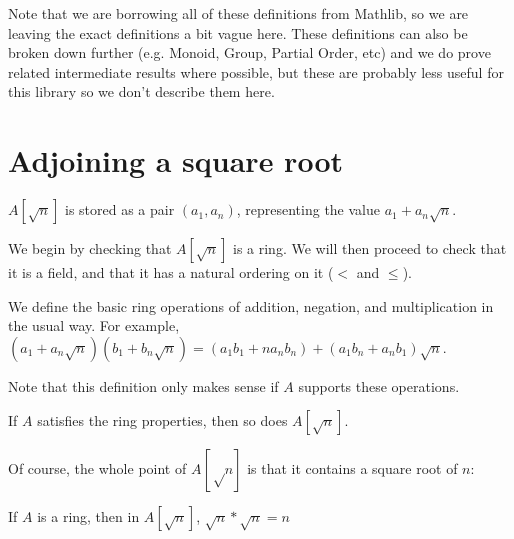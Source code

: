 Note that we are borrowing all of these definitions from Mathlib, so we are
leaving the exact definitions a bit vague here.  These definitions can also be
broken down further (e.g. Monoid, Group, Partial Order, etc) and we do prove
related intermediate results where possible, but these are probably less useful
for this library so we don't describe them here.

\section{Adjoining a square root}


\begin{definition}
  \label{def:adjoin}
  \leanok
  $A[\sqrt{n}]$ is stored as a pair $(a_1, a_n)$, representing the value
  $a_1 + a_n\sqrt{n}$.
\end{definition}

We begin by checking that $A[\sqrt{n}]$ is a ring. We will then proceed to check
that it is a field, and that it has a natural ordering on it ($<$ and $≤$).

\begin{definition}
  \label{def:adjoinRingOps}
  We define the basic ring operations of addition, negation, and multiplication
  in the usual way.
  For example, $(a_1 + a_n\sqrt{n})(b_1 + b_n\sqrt{n}) = (a_1b_1 + na_nb_n) + (a_1b_n + a_nb_1)\sqrt{n}$.

  Note that this definition only makes sense if $A$ supports these operations.
\end{definition}


\begin{proposition}
  \label{thm:adjoinRing}
  \leanok
  If $A$ satisfies the ring properties, then so does $A[\sqrt{n}]$.
\end{proposition}


Of course, the whole point of $A[√n]$ is that it contains a square root of $n$:
\begin{theorem}
  \label{thm:adjoinHasSqrtN}
  If $A$ is a ring, then in $A[\sqrt{n}]$, $\sqrt{n} * \sqrt{n} = n$
\end{theorem}


